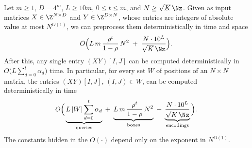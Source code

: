 \begin{theorem}\label{thm:singletech}
Let $m\ge1$, $D=4^m$, $L\ge10m$, $0\le t\le m$, and $N\ge\sqrt K\,\Nz$. Given as input matrices $X\in\Z^{N\times D}$ and $Y\in\Z^{D\times N}$, whose entries are integers of absolute value at most $N^{O(1)}$, we can preprocess them deterministically in time and space
\begin{equation}\label{eq:prep}
O\Big(L\,m\,\frac{\rho^t}{1-\rho}\,N^2\;+\;\frac{N\cdot10^L}{\sqrt K\,\Nz}\Big).
\end{equation}
After this, any single entry $(XY)[I,J]$ can be computed deterministically in $O\big(L\sum_{d=0}^{t}\alpha_d\big)$ time. In particular, for every set $W$ of positions of an $N\times N$ matrix, the entries $(XY)[I,J]$, $(I,J)\in W$, can be computed deterministically in time
\begin{equation}\label{eq:wanted}
O\Big(\underbrace{L\,|W|\sum_{d=0}^{t}\alpha_d}_{\text{\normalfont queries}}\;+\;\underbrace{L\,m\,\frac{\rho^t}{1-\rho}\,N^2}_{\text{\normalfont boxes}}\;+\;\underbrace{\frac{N\cdot10^L}{\sqrt K\,\Nz}}_{\text{\normalfont encodings}}\Big).
\end{equation}
The constants hidden in the $O(\cdot)$ depend only on the exponent in $N^{O(1)}$.
\end{theorem}


